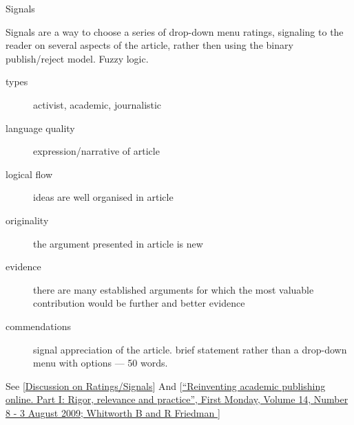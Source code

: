 \begin{frame}{Signals}

Signals are a way to choose a series of drop-down menu ratings, signaling to the reader on several aspects of the article, rather then using the binary publish/reject model. Fuzzy logic.

\begin{description}
\item [types] activist, academic, journalistic

\item [language quality] expression/narrative of article 
\item [logical flow] ideas are well organised in article
\item [originality] the argument presented in article is new
\item [evidence] there are many established arguments for which the most valuable contribution would be further and better evidence
\item [commendations] signal appreciation of the article. brief statement rather than a drop-down menu with options --- 50 words.
\end{description}

\scriptsize See
            [\href{http://www.oekonux.org/journal/list/archive/msg00233.html}{Discussion
                on Ratings/Signals}] And
            [\href{http://firstmonday.org/htbin/cgiwrap/bin/ojs/index.php/fm/article/view/2642/2287}{``Reinventing
                academic publishing online. Part I: Rigor, relevance
                and practice'', First Monday, Volume 14, Number 8 - 3
                August 2009; Whitworth B and R Friedman }]




\end{frame}

